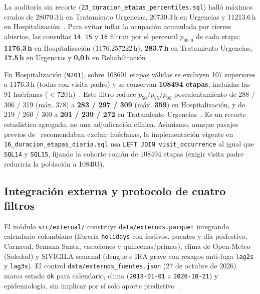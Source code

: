 La auditoría sin recorte (\nolinkurl{23_duracion_etapas_percentiles.sql}) halló máximos crudos de \num{28070,3}\,h en Tratamiento Urgencias, \num{20730,3}\,h en Urgencias y \num{11213,6}\,h en Hospitalización~\cite{mediflow2026saturacion,mediflow2026informe}. Para evitar inflar la ocupación acumulada por cierres abiertos, las consultas \texttt{14}, \texttt{15} y \texttt{16} filtran por el percentil $p_{99{,}9}$ de cada etapa: \textbf{\num{1176,3}\,h} en Hospitalización (\num{1176,257222}\,h), \textbf{\num{283,7}\,h} en Tratamiento Urgencias, \textbf{\num{17,5}\,h} en Urgencias y \textbf{0,0\,h} en Rehabilitación~\cite{mediflow2026saturacion}.

En Hospitalización (\texttt{9201}), sobre \num{108601} etapas válidas se excluyen 107 superiores a \num{1176,3}\,h (todas con visita padre) y se conservan \textbf{\num{108494} etapas}, incluidas las 91 huérfanas ($<720$\,h)~\cite{mediflow2026informe}. Este filtro reduce $p_{50}/p_{75}/p_{90}$ poscalentamiento de 288 / 306 / 319 (máx. 378) a \textbf{283 / 297 / 309} (máx. \textbf{359}) en Hospitalización, y de 219 / 260 / 300 a \textbf{201 / 239 / 272} en Tratamiento Urgencias~\cite{mediflow2026informe}. Es un recorte estadístico agregado, no una adjudicación clínica. Asimismo, aunque pasajes previos de~\cite{mediflow2026calidad} recomendaban excluir huérfanas, la implementación vigente en \texttt{16\_duracion\_etapas\_diaria.sql} usa \texttt{LEFT JOIN visit\_occurrence} al igual que \texttt{SQL14} y \texttt{SQL15}, fijando la cohorte común de \num{108494} etapas (exigir visita padre reduciría la población a \num{108403}).

\subsection{Integración externa y protocolo de cuatro filtros}

El módulo \texttt{src/external/} construye \texttt{data/externos.parquet} integrando calendario colombiano (librería \texttt{holidays} con festivos, puentes y día posfestivo, Carnaval, Semana Santa, vacaciones y quincenas/primas), clima de Open-Meteo (Soledad) y SIVIGILA semanal (dengue e IRA grave con rezagos anti-fuga \texttt{lag2s} y \texttt{lag3s}). El control \texttt{data/externos\_fuentes.json} (27 de octubre de 2026) marca estado \texttt{ok} para calendario, clima (\texttt{2018-01-01} a \texttt{2026-10-21}) y epidemiología, sin implicar por sí solo aporte predictivo~\cite{mediflow2026informe}.

